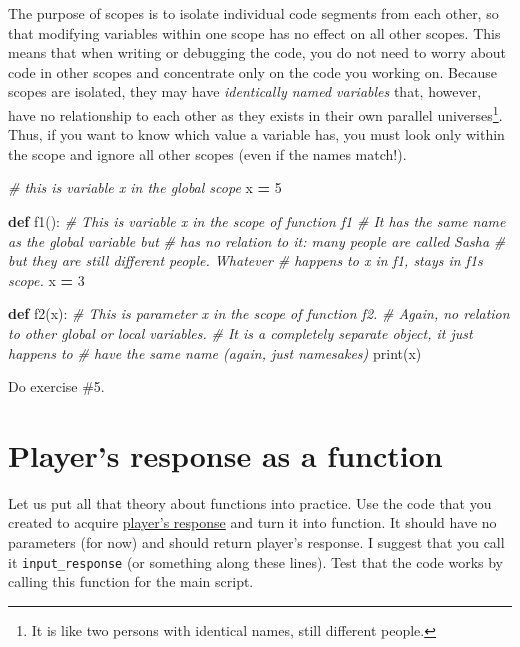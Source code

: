 \documentclass[
]{book}
\newenvironment{Shaded}{\begin{snugshade}}{\end{snugshade}}
\newcommand{\BuiltInTok}[1]{#1}
\newcommand{\CommentTok}[1]{\textcolor[rgb]{0.56,0.35,0.01}{\textit{#1}}}
\newcommand{\DecValTok}[1]{\textcolor[rgb]{0.00,0.00,0.81}{#1}}
\newcommand{\KeywordTok}[1]{\textcolor[rgb]{0.13,0.29,0.53}{\textbf{#1}}}
\newcommand{\NormalTok}[1]{#1}
\newcommand{\OperatorTok}[1]{\textcolor[rgb]{0.81,0.36,0.00}{\textbf{#1}}}
\begin{document}
The purpose of scopes is to isolate individual code segments from each other, so that modifying variables within one scope has no effect on all other scopes. This means that when writing or debugging the code, you do not need to worry about code in other scopes and concentrate only on the code you working on. Because scopes are isolated, they may have \emph{identically named variables} that, however, have no relationship to each other as they exists in their own parallel universes\footnote{It is like two persons with identical names, still different people.}. Thus, if you want to know which value a variable has, you must look only within the scope and ignore all other scopes (even if the names match!).

\begin{Shaded}
\begin{Highlighting}[]
\CommentTok{\# this is variable \textasciigrave{}x\textasciigrave{} in the global scope}
\NormalTok{x  }\OperatorTok{=} \DecValTok{5} 

\KeywordTok{def}\NormalTok{ f1():}
  \CommentTok{\# This is variable \textasciigrave{}x\textasciigrave{} in the scope of function f1}
  \CommentTok{\# It has the same name as the global variable but}
  \CommentTok{\# has no relation to it: many people are called Sasha }
  \CommentTok{\# but they are still different people. Whatever}
  \CommentTok{\# happens to \textasciigrave{}x\textasciigrave{} in f1, stays in f1\textquotesingle{}s scope.}
\NormalTok{  x }\OperatorTok{=} \DecValTok{3}
  
  
\KeywordTok{def}\NormalTok{ f2(x):}
  \CommentTok{\# This is parameter \textasciigrave{}x\textasciigrave{} in the scope of function f2.}
  \CommentTok{\# Again, no relation to other global or local variables.}
  \CommentTok{\# It is a completely separate object, it just happens to }
  \CommentTok{\# have the same name (again, just namesakes)}
  \BuiltInTok{print}\NormalTok{(x)}
\end{Highlighting}
\end{Shaded}

Do exercise \#5.

\hypertarget{players-response-as-a-function}{%
\section{Player's response as a function}\label{players-response-as-a-function}}

Let us put all that theory about functions into practice. Use the code that you created to acquire \protect\hyperlink{guess-the-number-players-response}{player's response} and turn it into function. It should have no parameters (for now) and should return player's response. I suggest that you call it \texttt{input\_response} (or something along these lines). Test that the code works by calling this function for the main script.
\end{document}
